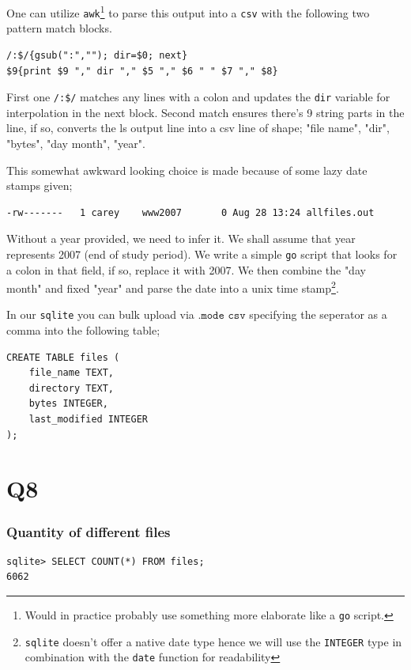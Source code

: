 \documentclass{article}
\begin{document}
One can utilize \texttt{awk}\footnote{Would in practice probably use something more elaborate like a \texttt{go} script.} to parse this output into a \texttt{csv} with the following two pattern match blocks.
\begin{small}
\begin{verbatim}
/:$/{gsub(":",""); dir=$0; next}
$9{print $9 "," dir "," $5 "," $6 " " $7 "," $8}
\end{verbatim}
\end{small}

First one \texttt{/:\$/} matches any lines with a colon and updates the \texttt{dir} variable for interpolation in the next block. Second match ensures there's 9 string parts in the line, if so, converts the ls output line into a csv line of shape; "file name", "dir", "bytes", "day month", "year".

This somewhat awkward looking choice is made because of some lazy date stamps given;
\begin{small}
\begin{verbatim}
-rw-------   1 carey    www2007       0 Aug 28 13:24 allfiles.out
\end{verbatim}
\end{small}
Without a year provided, we need to infer it. We shall assume that year represents 2007 (end of study period). We write a simple \texttt{go} script that looks for a colon in that field, if so, replace it with 2007. We then combine the "day month" and fixed "year" and parse the date into a unix time stamp\footnote{\texttt{sqlite} doesn't offer a native date type hence we will use the \texttt{INTEGER} type in combination with the \texttt{date} function for readability}.

In our \texttt{sqlite} you can bulk upload via $\texttt{.mode csv}$ specifying the seperator as a comma into the following table;

\begin{small}
\begin{verbatim}
CREATE TABLE files (
    file_name TEXT,
    directory TEXT,
    bytes INTEGER,
    last_modified INTEGER
);
\end{verbatim}
\end{small}

\section*{Q8}
\subsubsection*{Quantity of different files}
\begin{small}
\begin{verbatim}
sqlite> SELECT COUNT(*) FROM files;                                 
6062
\end{verbatim}
\end{small}
\end{document}
